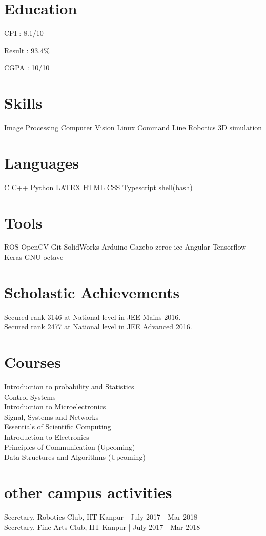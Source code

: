 \documentclass[]{deedy-resume-openfont}
\begin{document}
\sectionsep

\section{Education}

CPI : 8.1/10
\sectionsep

Result : 93.4\%
\sectionsep

CGPA : 10/10
\sectionsep

\section{Skills}
Image Processing \textbullet{} Computer Vision \textbullet{} Linux Command Line \textbullet{} Robotics \textbullet{} 3D simulation
\section{Languages}
C \textbullet{}   C++ \textbullet{} Python \textbullet{} LATEX \textbullet{} HTML \textbullet{} CSS \textbullet{} Typescript \textbullet{} shell(bash)
\section{Tools}
ROS \textbullet{} OpenCV \textbullet{} Git \textbullet{} SolidWorks \textbullet{} Arduino \textbullet{} Gazebo \textbullet{} zeroc-ice \textbullet{} Angular \textbullet{} Tensorflow \textbullet{} Keras \textbullet{} GNU octave
\sectionsep
\hfill

\section{Scholastic Achievements}
 Secured rank 3146 at National level in JEE Mains 2016. \\ 
 Secured rank 2477 at National level in JEE Advanced 2016.
\sectionsep

\section{Courses}
Introduction to probability and Statistics \\
Control Systems \\
Introduction to Microelectronics \\
Signal, Systems and Networks \\
Essentials of Scientific Computing \\
Introduction to Electronics \\
Principles of Communication (Upcoming) \\
Data Structures and Algorithms (Upcoming)
\sectionsep

\section{other campus activities}
Secretary, Robotics Club, IIT Kanpur | July 2017 - Mar 2018 \\
Secretary, Fine Arts Club, IIT Kanpur | July 2017 - Mar 2018 \\
\end{document}
